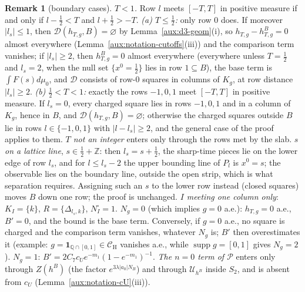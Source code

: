 \documentclass[11pt,a4paper]{article}
\theoremstyle{plain}
\theoremstyle{definition}
\theoremstyle{plain}
\theoremstyle{definition}
\newtheorem{auxrem}[auxlemma]{Remark}
\newcommand{\Z}{\mathbb{Z}}
\newcommand{\CH}{\mathcal{C}_{\mathrm H}}
\DeclareMathOperator{\supp}{supp}
\newcommand{\Uc}{\mathcal U}
\newcommand{\dmu}{d\mu_0}
\begin{document}
\begin{auxrem}[boundary cases]\label{aux:d3-boundary}
\emph{$T<1$.}  Row $l$ meets $[-T,T]$ in positive measure if and only if $l-\frac12<T$ and
$l+\frac12>-T$.  \emph{(a) $T\le\frac12$:} only row $0$ does.  If moreover $|l_s|\le1$, then
$\mathcal D(h_{T,g},B)=\varnothing$ by Lemma~\ref{aux:d3-geom}(i), so $h_{T,g}-h_{T,g}^B=0$ almost
everywhere (Lemma~\ref{aux:notation-cutoffs}(iii)) and the comparison term vanishes; if
$|l_s|\ge2$, then $h_{T,g}^B=0$ almost everywhere (everywhere unless $T=\frac12$ and $l_s=2$, when the null
set $\{x^0=\frac12\}$ lies in row $1\subseteq B$), the base term is $\int F(s)\dmu$, and
$\mathcal D$ consists of row-$0$ squares in columns of $K_g$, at row distance $|l_s|\ge2$.
\emph{(b) $\frac12<T<1$:} exactly the rows $-1,0,1$ meet $[-T,T]$ in positive measure.  If
$l_s=0$, every charged square lies in rows $-1,0,1$ and in a column of $K_g$, hence in $B$, and
$\mathcal D(h_{T,g},B)=\varnothing$; otherwise the charged squares outside $B$ lie in rows
$l\in\{-1,0,1\}$ with $|l-l_s|\ge2$, and the general case of the proof applies to them.
\emph{$T$ not an integer} enters only through the rows met by the slab.
\emph{$s$ on a lattice line}, $s\in\frac12+\Z$: then $l_s=s+\frac12$, the sharp-time pieces lie on
the lower edge of row $l_s$, and for $l\le l_s-2$ the upper bounding line of $P_l$ is $x^0=s$; the
observable lies on the boundary line, outside the open strip, which is what separation requires.
Assigning such an $s$ to the lower row instead (closed squares) moves $B$ down one row; the proof
is unchanged.
\emph{$I$ meeting one column only}: $K_I=\{k\}$, $R=\{\Delta_{l_s,k}\}$, $N^\square_I=1$.
\emph{$N_g=0$} (which implies $g=0$ a.e.): $h_{T,g}=0$ a.e., $B'=0$, and the bound is the base
term.  Conversely, if $g=0$ a.e., no square is charged and the comparison term vanishes, whatever
$N_g$ is; $B'$ then overestimates it (example: $g=\mathbf 1_{\mathbb Q\cap[0,1]}\in\CH$ vanishes
a.e., while $\supp g=[0,1]$ gives $N_g=2$).
\emph{$N_g=1$}: $B'=2C_7c_Ue^{-m_1}(1-e^{-m_1})^{-1}$.
\emph{The $n=0$ term of $\mathscr P$} enters only through $Z(h^B)$ (the factor
$e^{3\lambda|a_0|N_B}$) and through $\Uc_{h^B}$ inside $S_2$, and is absent from $c_U$
(Lemma~\ref{aux:notation-cU}(iii)).
\end{auxrem}
\end{document}
